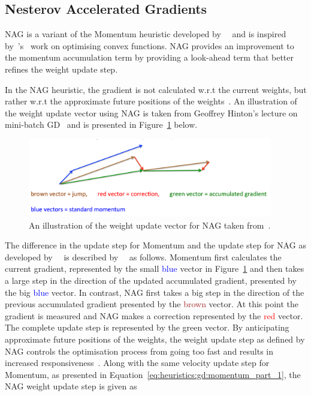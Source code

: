\subsection{Nesterov Accelerated Gradients}\label{sec:heuristics:nag}

\Acf{NAG} is a variant of the \acs{Momentum} heuristic developed by~\citeauthor{ref:sutskever:2013}~\cite{ref:sutskever:2013} and is inspired by~\citeauthor{ref:nesterov:1983}'s~\cite{ref:nesterov:1983} work on optimising convex functions. \acs{NAG} provides an improvement to the momentum accumulation term by providing a look-ahead term that better refines the weight update step.

In the \acs{NAG} heuristic, the gradient is not calculated w.r.t the current weights, but rather w.r.t the approximate future positions of the weights~\cite{ref:sutskever:2013, ref:ruder:2016}. An illustration of the weight update vector using \acs{NAG} is taken from Geoffrey Hinton's lecture on mini-batch \acs{GD}~\cite{ref:hinton:2012} and is presented in Figure~\ref{fig:heuristics:gd:nag} below.

\begin{figure}[htbp]
	\centering
	\includegraphics[width=0.95\textwidth]{images/nag.pdf}
	\caption{An illustration of the weight update vector for \acf{NAG} taken from~\cite{ref:hinton:2012}.}
	\label{fig:heuristics:gd:nag}
\end{figure}

The difference in the update step for \acs{Momentum} and the update step for \acs{NAG} as developed by~\citeauthor{ref:sutskever:2013}~\cite{ref:sutskever:2013} is described by~\citeauthor{ref:ruder:2016}~\cite{ref:ruder:2016} as follows. \acs{Momentum} first calculates the current gradient, represented by the small \textcolor{blue}{blue} vector in Figure~\ref{fig:heuristics:gd:nag} and then takes a large step in the direction of the updated accumulated gradient, presented by the big \textcolor{blue}{blue} vector. In contrast, \acs{NAG} first takes a big step in the direction of the previous accumulated gradient presented by the \textcolor{brown}{brown} vector. At this point the gradient is measured and \acs{NAG} makes a correction represented by the \textcolor{red}{red} vector. The complete update step is represented by the green vector. By anticipating approximate future positions of the weights, the weight update step as defined by \acs{NAG} controls the optimisation process from going too fast and results in increased responsiveness~\cite{ref:bengio:2013}. Along with the same velocity update step for \acs{Momentum}, as presented in Equation~\eqref{eq:heuristics:gd:momentum_part_1}, the \acs{NAG} weight update step is given as

